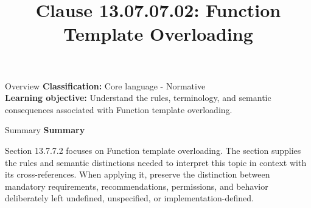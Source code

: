\documentclass[10pt,letterpaper]{article}
\title{Clause 13.07.07.02: Function Template Overloading}
\author{}
\date{}
\begin{document}
\maketitle
\begin{CornellOverviewBox}{Overview}
\textbf{Classification:} Core language - Normative\\[2pt]
\textbf{Learning objective:} Understand the rules, terminology, and semantic consequences associated with Function template overloading.
\end{CornellOverviewBox}\begin{CornellSummaryBox}{Summary}
{\sffamily\bfseries\color{Accent} Summary}\par\vspace{3pt}Section 13.7.7.2 focuses on Function template overloading. The section supplies the rules and semantic distinctions needed to interpret this topic in context with its cross-references. When applying it, preserve the distinction between mandatory requirements, recommendations, permissions, and behavior deliberately left undefined, unspecified, or implementation-defined.
\end{CornellSummaryBox}
\end{document}
